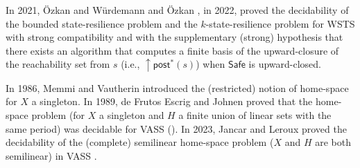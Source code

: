 \documentclass[runningheads]{llncs}
\newcommand{\post}{\textsf{post}}
\newcommand{\Bad}{\textsf{Bad}}
\newcommand{\Safe}{\textsf{Safe}}
\begin{document}
In 2021, \"Ozkan and Würdemann  \cite{DBLP:journals/corr/abs-2108-00889} and \"Ozkan \cite{DBLP:conf/gg/Ozkan22}, in 2022, proved the decidability of the bounded state-resilience problem and the $k$-state-resilience problem for WSTS  with strong compatibility and with the supplementary (strong) hypothesis that there exists an algorithm that computes a finite basis of the upward-closure of the reachability set from $s$ (i.e., $\mathop{\uparrow} \post^*(s)$) when $\Safe$ is upward-closed.
%

In 1986, Memmi and Vautherin introduced the (restricted) notion of home-space~\cite{DBLP:conf/ac/MemmiV86} for $X$ a singleton. In 1989, de Frutos Escrig and Johnen proved that the home-space problem (for $X$ a singleton and $H$ a finite union of linear sets with the same period) was decidable for VASS (\cite{de1989decidability}). In 2023, Jancar and Leroux proved the decidability of the (complete) semilinear home-space problem ($X$ and $H$ are both semilinear)  in VASS \cite{DBLP:journals/corr/abs-2207-02697}.
\end{document}
